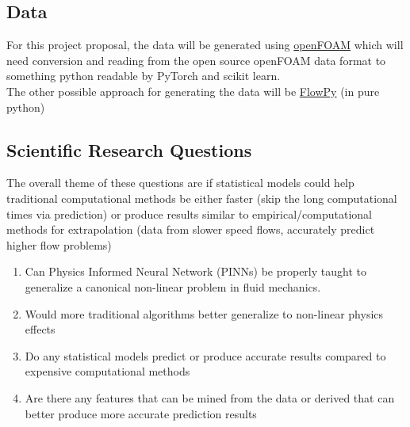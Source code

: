 \documentclass{article}
\begin{document}
	\subsection{Data}
	
	For this project proposal, the data will be generated using \textcolor{blue}{\href{https://www.openfoam.com/documentation/tutorial-guide/2-incompressible-flow/2.1-lid-driven-cavity-flowURL}{openFOAM}} which will need conversion and reading from the open source openFOAM data format to something python readable by PyTorch and scikit learn. \\
	
	\noindent The other possible approach for generating the data will be \textcolor{blue}{\href{https://github.com/gauravsdeshmukh/FlowPy}{FlowPy}} (in pure python)
	
	\subsection{Scientific Research Questions}
	
	The overall theme of these questions are if statistical models could help traditional computational methods be either faster (skip the long computational times via prediction) or produce results similar to empirical/computational methods for extrapolation (data from slower speed flows, accurately predict higher flow problems)
	
	\begin{enumerate}
		\item Can Physics Informed Neural Network (PINNs) be properly taught to generalize a canonical non-linear problem in fluid mechanics.
		\item Would more traditional algorithms better generalize to non-linear physics effects
		\item Do any statistical models predict or produce accurate results compared to expensive computational methods
		\item Are there any features that can be mined from the data or derived that can better produce more accurate prediction results 
	\end{enumerate}
	
\end{document}
